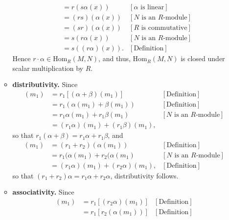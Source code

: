 \documentclass[9pt]{article}
\begin{document}
\begin{enumerate}
\begin{itemize}
\begin{align*}
                     &= r(s\alpha(x)) &[\alpha \text{ is linear}] \\
                     &= (rs)(\alpha(x)) &[N \text{ is an } R\text{-module}] \\
                     &= (sr)(\alpha(x)) &[R \text{ is commutative}] \\
                     &= s(r\alpha(x)) &[N \text{ is an } R\text{-module}] \\
                     &= s((r\alpha)(x)). &[\text{Definition}]
               \end{align*}
               Hence $r \cdot \alpha \in \text{Hom}_R(M, N)$, and thus,
               $\text{Hom}_R(M, N)$ is closed under scalar multiplication by
               $R$.
         \item \textbf{distributivity.} Since
               \begin{align*}
                  [r_1(\alpha + \beta)](m_1) &= r_1[(\alpha + \beta)(m_1)]
                     &[\text{Definition}] \\
                     &= r_1(\alpha(m_1) + \beta(m_1)) &[\text{Definition}] \\
                     &= r_1\alpha(m_1) + r_1\beta(m_1)
                        &[N \text{ is an } R\text{-module}] \\
                     &= (r_1\alpha)(m_1) + (r_1\beta)(m_1),
               \end{align*}
               so that $r_1(\alpha + \beta) = r_1\alpha + r_1\beta$, and
               \begin{align*}
                  [(r_1 + r_2)\alpha](m_1) &= (r_1 + r_2)(\alpha(m_1))
                     &[\text{Definition}] \\
                     &= r_1(\alpha(m_1) + r_2(\alpha(m_1) 
                        &[N \text{ is an } R\text{-module}] \\
                     &= (r_1\alpha)(m_1) +(r_2\alpha)(m_1), &[\text{Definition}]
               \end{align*}
               so that $(r_1 + r_2)\alpha = r_1\alpha + r_2\alpha$,
               distributivity follows.
         \item \textbf{associativity.} Since
               \begin{align*}
                  [r_1(r_2\alpha)](m_1) &= r_1[(r_2\alpha)(m_1)]
                     &[\text{Definition}] \\
                     &= r_1[r_2(\alpha(m_1))] &[\text{Definition}] \\

\end{align*}
\end{itemize}
\end{enumerate}
\end{document}
